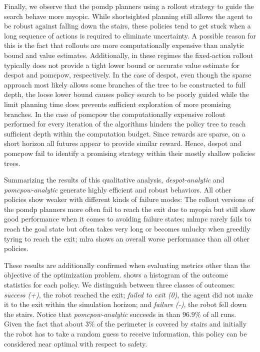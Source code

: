 Finally, we observe that the \ac{pomdp} planners using a rollout strategy to
guide the search behave more myopic. While shortsighted planning still allows
the agent to be robust against falling down the stairs, these policies tend to
get stuck when a long sequence of actions is required to eliminate uncertainty.
A possible reason for this is the fact that rollouts are more computationally
expensive than analytic bound and value estimates. Additionally, in these
regimes the fixed-action rollout typically does not provide a tight lower bound
or accurate value estimate for \ac{despot} and \ac{pomcpow}, respectively. In
the case of \ac{despot}, even though the sparse approach most likely allows
some branches of the tree to be constructed to full depth, the loose lower
bound causes policy search to be poorly guided while the limit planning time
does prevents sufficient exploration of more promising branches. In the case of
\ac{pomcpow} the computationally expensive rollout performed for every iteration
of the algorithms hinders the policy tree to reach sufficient depth within
the computation budget. Since rewards are sparse, on a short horizon all
futures appear to provide similar reward. Hence, \ac{despot} and \ac{pomcpow}
fail to identify a promising strategy within their mostly shallow policies trees.


Summarizing the results of this qualitative analysis,
\emph{\ac{despot}-analytic} and \emph{\ac{pomcpow}-analytic} generate highly
efficient and robust behaviors. All other policies show weaker with different
kinds of failure modes: The rollout versions of the \ac{pomdp} planners more
often fail to reach the exit due to myopia but still show good performance when
it comes to avoiding failure states; \ac{mlmpc} rarely fails to reach the goal
state but often takes very long or becomes unlucky when greedily tyring to
reach the exit; \ac{mlra} shows an overall worse performance than all other
policies.

These results are additionally confirmed when evaluating metrics other than the
objective of the optimization problem.  shows a histogram
of the outcome statistics for each policy. We distinguish between three classes
of outcomes: \emph{success (+)}, the robot reached the exit; \emph{failed to
exit (0)}, the agent did not make it to the exit within the simulation horizon;
and \emph{failure (-)}, the robot fell down the stairs. Notice that
\emph{\ac{pomcpow}-analytic} succeeds in than $96.9\%$ of all runs. Given the
fact that about $3\%$ of the perimeter is covered by stairs and initially the
robot has to take a random guess to receive information, this policy can be
considered near optimal with respect to safety.


